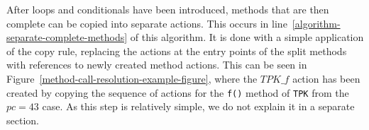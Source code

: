 After loops and conditionals have been introduced, methods that are
then complete can be copied into separate actions.
This occurs in line~\ref{algorithm-separate-complete-methods} of this
algorithm.
It is done with a simple application of the copy rule, replacing the
actions at the entry points of the split methods with references to
newly created method actions.
This can be seen in
Figure~\ref{method-call-resolution-example-figure}, where the $TPK\_f$
action has been created by copying the sequence of actions for the
\texttt{f()} method of \texttt{TPK} from the $pc = 43$ case.
As this step is relatively simple, we do not explain it in a separate
section.
\begin{figure}[tp!]
  \setlength{\zedindent}{0cm}
  \setlength{\zedtab}{0.3cm}
  \setlength{\zedleftsep}{0cm}
  \setlength{\abovedisplayskip}{0cm}
  \setlength{\belowdisplayskip}{0cm}
\end{figure}
